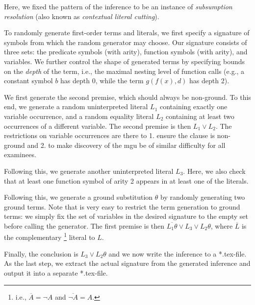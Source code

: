 Here, we fixed the pattern of the inference
to be an instance of \emph{subsumption resolution} (also known as \emph{contextual literal cutting}).

To randomly generate first-order terms and literals,
we first specify a signature of symbols from which the random generator may choose.
Our signature consists of three sets:
the predicate symbols (with arity),
function symbols (with arity),
and variables.
We further control the shape of generated terms
by specifying bounds on the \emph{depth} of the term,
i.e., the maximal nesting level of function calls
(e.g., a constant symbol $b$ has depth 0, while the term $g(f(x),d)$ has depth 2).

We first generate the second premise, which should always be non-ground.
To this end, we generate a random uninterpreted literal $L_1$ containing exactly one variable occurrence,
and a random equality literal $L_2$ containing at least two occurrences of a different variable.
The second premise is then $L_1 \lor L_2$.
The restrictions on variable occurrences are there to 1. ensure the clause is non-ground
and 2. to make discovery of the mgu be of similar difficulty for all examinees.

Following this, we generate another uninterpreted literal $L_3$.
Here, we also check that at least one function symbol of arity 2 appears in at least one of the literals.

Following this, we generate a ground substitution $\theta$ by randomly generating two ground terms.
Note that is very easy to restrict the term generation to ground terms:
we simply fix the set of variables in the desired signature to the empty set before calling the generator.
The first premise is then $\overline{L_1\theta} \lor L_3 \lor L_2\theta$,
where $\overline{L}$ is the complementary%
\footnote{i.e., $\overline{A} = \lnot A$ and $\overline{\lnot A} = A$.}
literal to $L$.

Finally, the conclusion is $L_3 \lor L_2\theta$ and we now write the inference to a *.tex-file.
As the last step,
we extract the actual signature from the generated inference and output it into a separate *.tex-file.
